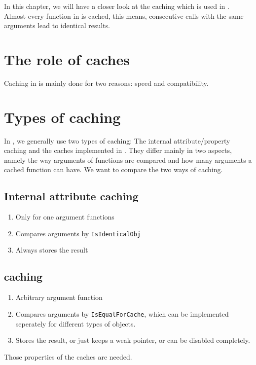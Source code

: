 In this chapter, we will have a closer look at the caching
which is used in \CapPkg. Almost every function in \CapPkg is cached,
this means, consecutive calls with the same arguments lead to identical results.

\section{The role of caches}

Caching in \CapPkg is mainly done for two reasons: speed and compatibility.

\section{Types of caching}

In \CapPkg, we generally use two types of caching: The \GAP internal attribute/property caching and
the caches implemented in \CapPkg. They differ mainly in two aspects, namely the way arguments of
functions are compared and how many arguments a cached function can have. We want to compare the two
ways of caching.

\subsection{Internal attribute caching}
\begin{enumerate}
 \item Only for one argument functions
 \item Compares arguments by \texttt{IsIdenticalObj}
 \item Always stores the result
\end{enumerate}

\subsection{\CapPkg caching}
\begin{enumerate}
 \item Arbitrary argument function
 \item Compares arguments by \texttt{IsEqualForCache}, which can be implemented seperately for different types of objects.
 \item Stores the result, or just keeps a weak pointer, or can be disabled completely.
\end{enumerate}

Those properties of the \CapPkg caches are needed.

